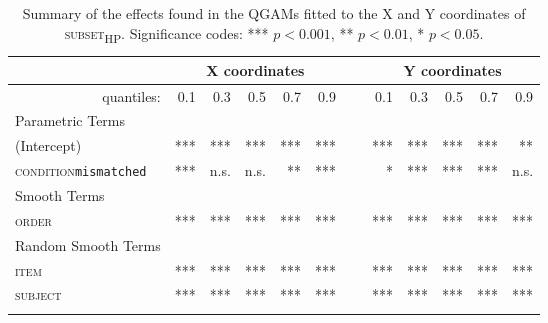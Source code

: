 \clearpage
\begin{table}[p]
\fontsize{9}{10}
\caption{Summary of the effects found in the QGAMs fitted to the X and Y coordinates of \textsc{subset\textsubscript{HP}}. Significance codes: *** $p < 0.001$, ** $p < 0.01$, * $p < 0.05$.}
\label{tab:8.7}
\centering
\begin{tabular}{lrrrrrrrrrrr}
\lsptoprule
~                   & \multicolumn{5}{c}{X coordinates}       & \multicolumn{1}{c}{}                       & \multicolumn{5}{c}{Y coordinates}                               \\
\midrule
\multicolumn{1}{r}{quantiles:}          & 0.1        & 0.3        & 0.5        & 0.7        & 0.9 & ~       & 0.1        & 0.3        & 0.5        & 0.7        & 0.9         \\
\midrule
Parametric Terms    & \textbf{~} & \textbf{~} & \textbf{~} & \textbf{~} & \textbf{~} & \textbf{~} & \textbf{~} & \textbf{~} & \textbf{~} & \textbf{~}  \\
\midrule
(Intercept)         & ***        & ***        & ***        & ***        & *** & ~       & ***        & ***        & ***        & ***        & **          \\
\textsc{condition}\texttt{mismatched} & ***       & n.s.          & n.s.        & **        & ***  & ~      & *       & ***        & ***        & ***        & n.s.         \\
\midrule
Smooth Terms        & \textbf{~} & \textbf{~} & \textbf{~} & \textbf{~} & \textbf{~} & \textbf{~} & \textbf{~} & \textbf{~} & \textbf{~} & \textbf{~}  \\
\midrule
\textsc{order}               & ***        & ***        & ***        & ***        & ***   & ~     & ***        & ***        & ***        & ***        & ***         \\
\midrule
Random Smooth Terms & \textbf{~} & \textbf{~} & \textbf{~} & \textbf{~} & \textbf{~} & \textbf{~} & \textbf{~} & \textbf{~} & \textbf{~} & \textbf{~}  \\
\midrule
\textsc{item}                & ***        & ***        & ***        & ***        & ***  & ~      & ***        & ***        & ***        & ***        & ***         \\
\textsc{subject}             & ***        & ***        & ***        & ***        & ***  & ~      & ***        & ***        & ***        & ***        & ***        \\
\lspbottomrule
\end{tabular}
\end{table}

